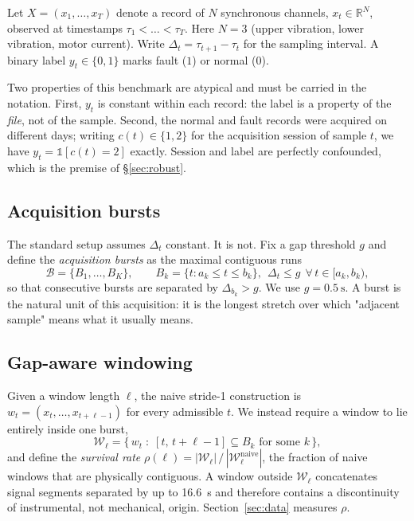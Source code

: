 \documentclass{article}
\begin{document}
Let $X=(x_1,\dots,x_T)$ denote a record of $N$ synchronous channels, $x_t\in
\mathbb{R}^{N}$, observed at timestamps $\tau_1<\dots<\tau_T$. Here $N=3$
(upper vibration, lower vibration, motor current). Write
$\Delta_t=\tau_{t+1}-\tau_t$ for the sampling interval. A binary label
$y_t\in\{0,1\}$ marks fault ($1$) or normal ($0$).

Two properties of this benchmark are atypical and must be carried in the
notation. First, $y_t$ is constant within each record: the label is a property
of the \emph{file}, not of the sample. Second, the normal and fault records
were acquired on different days; writing $c(t)\in\{1,2\}$ for the acquisition
session of sample $t$, we have $y_t=\mathbb{1}[c(t)=2]$ exactly. Session and
label are perfectly confounded, which is the premise of \S\ref{sec:robust}.

\subsection{Acquisition bursts}
\label{sub:bursts}

The standard setup assumes $\Delta_t$ constant. It is not. Fix a gap threshold
$g$ and define the \emph{acquisition bursts} as the maximal contiguous runs
\begin{equation}
\mathcal{B}=\{B_1,\dots,B_K\},\qquad
B_k=\{t: a_k \le t \le b_k\},\ \ \Delta_t\le g\ \ \forall\, t\in[a_k,b_k),
\label{eq:burst}
\end{equation}
so that consecutive bursts are separated by $\Delta_{b_k}>g$. We use
$g=\SI{0.5}{\second}$. A burst is the natural unit of this acquisition: it is
the longest stretch over which "adjacent sample" means what it usually means.

\subsection{Gap-aware windowing}

Given a window length $\ell$, the naive stride-1 construction is
$w_t=(x_t,\dots,x_{t+\ell-1})$ for every admissible $t$. We instead require a
window to lie entirely inside one burst,
\begin{equation}
\mathcal{W}_\ell=\bigl\{\,w_t \;:\; [t,\,t+\ell-1]\subseteq B_k \text{ for some } k \,\bigr\},
\label{eq:gapaware}
\end{equation}
and define the \emph{survival rate}
$\rho(\ell)=|\mathcal{W}_\ell| \,/\, |\mathcal{W}^{\mathrm{naive}}_\ell|$,
the fraction of naive windows that are physically contiguous. A window outside
$\mathcal{W}_\ell$ concatenates signal segments separated by up to
\SI{16.6}{\second} and therefore contains a discontinuity of instrumental, not
mechanical, origin. Section~\ref{sec:data} measures $\rho$.
\end{document}
